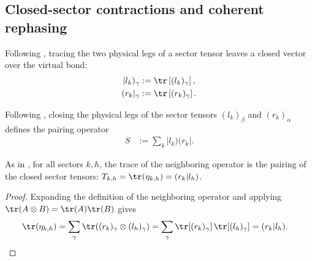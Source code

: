 \subsection{Closed-sector contractions and coherent rephasing}

\begin{definition}%
    \label{def:mpdo_closed_sector_tensors}
    \leanok
    Following \cite[Appendix~C.2, lines~1473--1477]{Cirac2016MPDO_arXiv},
    tracing the two physical legs of a sector tensor leaves a closed vector over
    the virtual bond:
    \begin{align}
        |l_k)_{\gamma} & :=\tr\left[(l_k)_{\gamma}\right], \notag \\
        (r_k|_{\gamma} & :=\tr\left[(r_k)_{\gamma}\right]. \notag
    \end{align}
\end{definition}

\begin{definition}
    \label{def:mpdo_closed_sector_pairing_operator}
    \leanok
    Following \cite[Appendix~C.2, lines~1473--1493]{Cirac2016MPDO_arXiv},
    closing the physical legs of the sector tensors $(l_k)_\beta$ and
    $(r_k)_\alpha$ defines the pairing operator
    \begin{align}
        S & :=\sum_k |l_k)(r_k|. \label{eq:rfp_pairing_operator}
    \end{align}
\end{definition}

\begin{lemma}
    \label{thm:mpdo_sector_trace_pairing}
    \leanok
    As in \cite[Appendix~C.2, lines~1452--1455
        and~1478--1481]{Cirac2016MPDO_arXiv}, for all sectors $k,h$, the trace
    of the neighboring operator is the pairing of the closed sector tensors:
    $T_{k,h}=\tr(\eta_{k,h})=(r_k|l_h)$.
\end{lemma}

\begin{proof}
    \leanok
    Expanding the definition of the neighboring operator and applying
    $\tr(A\otimes B)=\tr(A) \tr(B)$ gives
    \begin{align}
        \tr(\eta_{k,h})
         & =\sum_{\gamma}\tr((r_k)_{\gamma}\otimes(l_h)_{\gamma})
        =\sum_{\gamma}\tr[(r_k)_{\gamma}]\,\tr[(l_h)_{\gamma}]
        =(r_k|l_h). \notag
    \end{align}
\end{proof}


